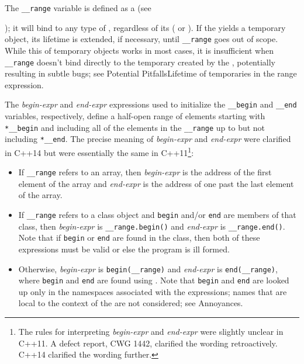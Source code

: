 The \lstinline!__range! variable is defined as a  (see {); it
will bind to any type of , regardless of its
 ( or ). If the
 yields a temporary object, its lifetime is
extended, if necessary, until \lstinline!__range! goes out of scope.
While this  of temporary objects works in
most cases, it is insufficient when \lstinline!__range! doesn't bind
directly to the temporary created by the , potentially resulting in subtle bugs; see {Potential
Pitfalls}{Lifetime of temporaries in the range expression}.

The \emph{begin-expr} and \emph{end-expr} expressions used to initialize
the \lstinline!__begin! and \lstinline!__end! variables, respectively,
define a half-open range of elements starting with \lstinline!*__begin!
and including all of the elements in the \lstinline!__range! up to but
not including \lstinline!*__end!. The precise meaning of
\emph{begin-expr} and \emph{end-expr} were clarified in C++14 but were
essentially the same in C++11{\cprotect\footnote{The rules for
interpreting \emph{begin-expr} and \emph{end-expr} were slightly
unclear in C++11. A defect report, CWG 1442, clarified the wording
  retroactively. C++14 clarified the wording further.}}:

\begin{itemize}
\item{If \lstinline!__range! refers to an array, then \emph{begin-expr} is the address of the first element of the array and \emph{end-expr} is the address of one past the last element of the array.}
\item{If \lstinline!__range! refers to a class object and \lstinline!begin! and/or \lstinline!end! are members of that class, then \emph{begin-expr} is \lstinline!__range.begin()! and \emph{end-expr} is \lstinline!__range.end()!. Note that if \lstinline!begin! or \lstinline!end! are found in the class, then both of these expressions must be valid or else the program is ill formed.}
\item{Otherwise, \emph{begin-expr} is \lstinline!begin(__range)! and \emph{end-expr} is \lstinline!end(__range)!, where \lstinline!begin! and \lstinline!end! are found using . Note that \lstinline!begin! and \lstinline!end! are looked up only in the namespaces associated with the expressions; names that are local to the context of the  are not considered; see Annoyances.}
\end{itemize}

}
